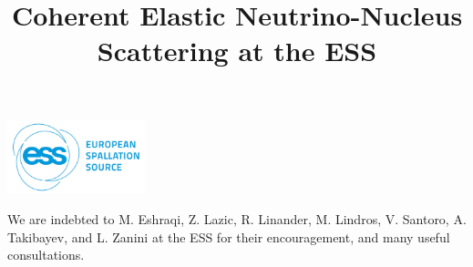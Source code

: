 \documentclass[a4paper,11pt]{article}
\begin{document}
\title{Coherent Elastic Neutrino-Nucleus Scattering  at the ESS \\ }






\newcommand*{\plogo}{\includegraphics[width=0.3\textwidth]{ESS_logo.png}}
\plogo










\notoctrue
\maketitle
\flushbottom
\notoc





\clearpage

\acknowledgments
We are indebted to M. Eshraqi, Z. Lazic, R. Linander, M. Lindros, V. Santoro, A. Takibayev, and L. Zanini at the ESS for their encouragement, and many useful consultations. 

%
%

\end{document}
